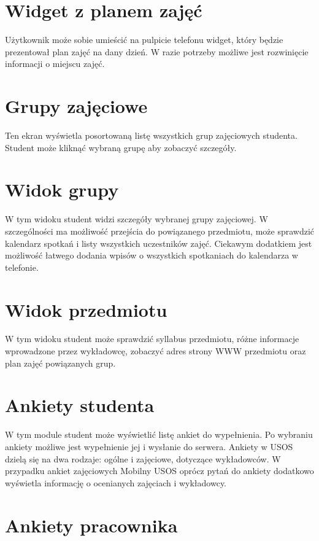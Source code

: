 \documentclass{pracamgr}
\begin{document}
\section{Widget z planem zajęć}

Użytkownik może sobie umieścić na pulpicie telefonu widget, który będzie prezentował
plan zajęć na dany dzień. W razie potrzeby możliwe jest rozwinięcie informacji o
miejscu zajęć.

\section{Grupy zajęciowe}

Ten ekran wyświetla posortowaną listę wszystkich grup zajęciowych studenta.
Student może kliknąć wybraną grupę aby zobaczyć szczegóły.

\section{Widok grupy}

W tym widoku student widzi szczegóły wybranej grupy zajęciowej. W szczególności
ma możliwość przejścia do powiązanego przedmiotu, może sprawdzić kalendarz spotkań
i listy wszystkich uczestników zajęć. Ciekawym dodatkiem jest możliwość łatwego
dodania wpisów o wszystkich spotkaniach do kalendarza w telefonie.

\section{Widok przedmiotu}

W tym widoku student może sprawdzić syllabus przedmiotu, różne informacje wprowadzone
przez wykładowcę, zobaczyć adres strony WWW przedmiotu oraz plan zajęć powiązanych grup.

\section{Ankiety studenta}

W tym module student może wyświetlić listę ankiet do wypełnienia. Po wybraniu ankiety
możliwe jest wypełnienie jej i wysłanie do serwera. Ankiety w USOS dzielą się na dwa
rodzaje: ogólne i zajęciowe, dotyczące wykładowców. W przypadku ankiet zajęciowych
Mobilny USOS oprócz pytań do ankiety dodatkowo wyświetla informację o ocenianych
zajęciach i wykładowcy.

\section{Ankiety pracownika}
\end{document}
